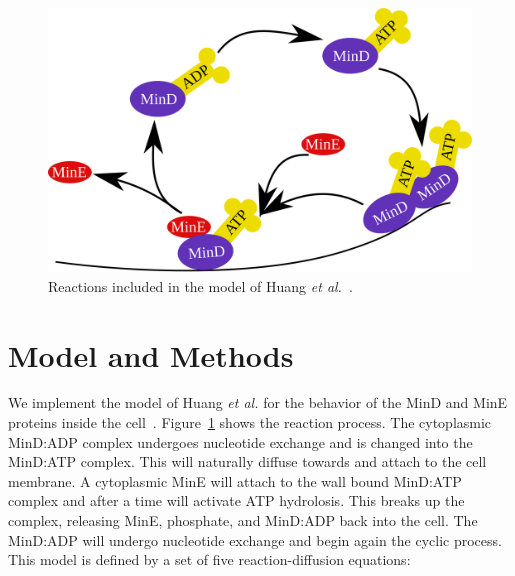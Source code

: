 \documentclass[letterpaper,twocolumn,amsmath,amssymb,pre]{revtex4-1}
\begin{document}
\begin{figure}
  \includegraphics[width=\columnwidth]{reactions}
  \caption{Reactions included in the model of Huang \emph{et
      al.}~\cite{huang2003dynamic}.}\label{fig:reactions}
\end{figure}

\section{Model and Methods}
We implement the model of Huang \emph{et al.}  for the behavior of the
MinD and MinE proteins inside the cell~\cite{huang2003dynamic}.
Figure~\ref{fig:reactions} shows the reaction process.  The
cytoplasmic MinD:ADP complex undergoes nucleotide exchange and is
changed into the MinD:ATP complex.  This will naturally diffuse
towards and attach to the cell membrane.  A cytoplasmic MinE will
attach to the wall bound MinD:ATP complex and after a time will
activate ATP hydrolosis.  This breaks up the complex, releasing MinE,
phosphate, and MinD:ADP back into the cell.  The MinD:ADP will undergo
nucleotide exchange and begin again the cyclic process.  This model is
defined by a set of five reaction-diffusion equations:
\end{document}
